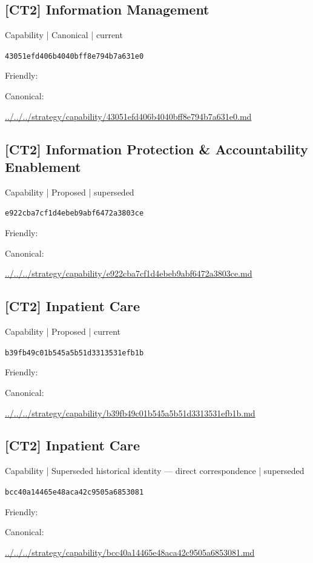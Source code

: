\documentclass[10pt,a4paper]{article}
\begin{document}
\subsection*{[CT2] Information Management}
{\small Capability | Canonical | current}\par
\texttt{43051efd406b4040bff8e794b7a631e0}\par
Friendly: \par
Canonical: \par
{\footnotesize\url{../../../strategy/capability/43051efd406b4040bff8e794b7a631e0.md}}\par
\subsection*{[CT2] Information Protection \& Accountability Enablement}
{\small Capability | Proposed | superseded}\par
\texttt{e922cba7cf1d4ebeb9abf6472a3803ce}\par
Friendly: \par
Canonical: \par
{\footnotesize\url{../../../strategy/capability/e922cba7cf1d4ebeb9abf6472a3803ce.md}}\par
\subsection*{[CT2] Inpatient Care}
{\small Capability | Proposed | current}\par
\texttt{b39fb49c01b545a5b51d3313531efb1b}\par
Friendly: \par
Canonical: \par
{\footnotesize\url{../../../strategy/capability/b39fb49c01b545a5b51d3313531efb1b.md}}\par
\subsection*{[CT2] Inpatient Care}
{\small Capability | Superseded historical identity — direct correspondence | superseded}\par
\texttt{bcc40a14465e48aca42c9505a6853081}\par
Friendly: \par
Canonical: \par
{\footnotesize\url{../../../strategy/capability/bcc40a14465e48aca42c9505a6853081.md}}\par
\end{document}
